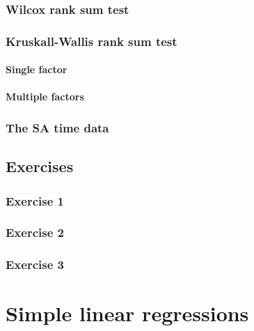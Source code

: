 \documentclass[english,10pt,a4paper,oneside]{book}
\begin{document}
\hypertarget{wilcox-rank-sum-test}{%
\subsection{Wilcox rank sum test}\label{wilcox-rank-sum-test}}

\hypertarget{kruskall-wallis-rank-sum-test}{%
\subsection{Kruskall-Wallis rank sum test}\label{kruskall-wallis-rank-sum-test}}

\hypertarget{single-factor-1}{%
\subsubsection{Single factor}\label{single-factor-1}}

\hypertarget{multiple-factors-1}{%
\subsubsection{Multiple factors}\label{multiple-factors-1}}

\hypertarget{the-sa-time-data}{%
\subsection{The SA time data}\label{the-sa-time-data}}

\hypertarget{exercises-4}{%
\section{Exercises}\label{exercises-4}}

\hypertarget{exercise-1-4}{%
\subsection{Exercise 1}\label{exercise-1-4}}

\hypertarget{exercise-2-1}{%
\subsection{Exercise 2}\label{exercise-2-1}}

\hypertarget{exercise-3}{%
\subsection{Exercise 3}\label{exercise-3}}

\hypertarget{simple-linear-regressions}{%
\chapter{Simple linear regressions}\label{simple-linear-regressions}}
\end{document}
